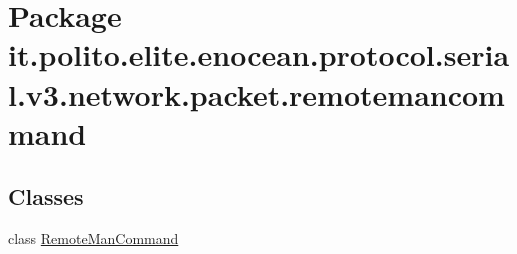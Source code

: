 \hypertarget{namespaceit_1_1polito_1_1elite_1_1enocean_1_1protocol_1_1serial_1_1v3_1_1network_1_1packet_1_1remotemancommand}{}\section{Package it.\+polito.\+elite.\+enocean.\+protocol.\+serial.\+v3.\+network.\+packet.\+remotemancommand}
\label{namespaceit_1_1polito_1_1elite_1_1enocean_1_1protocol_1_1serial_1_1v3_1_1network_1_1packet_1_1remotemancommand}
\subsection*{Classes}
\begin{DoxyCompactItemize}
\item 
class \hyperlink{classit_1_1polito_1_1elite_1_1enocean_1_1protocol_1_1serial_1_1v3_1_1network_1_1packet_1_1remoteb098a23adcfeb391a74cc6bc10c55d47}{Remote\+Man\+Command}
\end{DoxyCompactItemize}
